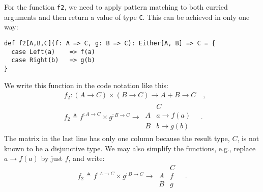 For the function \lstinline!f2!, we need to apply pattern matching
to both curried arguments and then return a value of type \lstinline!C!.
This can be achieved in only one way:
\begin{lstlisting}
def f2[A,B,C](f: A => C, g: B => C): Either[A, B] => C = {
  case Left(a)    => f(a)
  case Right(b)   => g(b)
}
\end{lstlisting}
We write this function in the code notation like this:
\begin{align*}
 & f_{2}:\left(A\rightarrow C\right)\times\left(B\rightarrow C\right)\rightarrow A+B\rightarrow C\quad,\\
 & f_{2}\triangleq f^{:A\rightarrow C}\times g^{:B\rightarrow C}\rightarrow\,\begin{array}{|c||c|}
 & C\\
\hline A & a\rightarrow f(a)\\
B & b\rightarrow g(b)
\end{array}\quad.
\end{align*}
The matrix in the last line has only one column because the result
type, $C$, is not known to be a disjunctive type. We may also simplify
the functions, e.g., replace $a\rightarrow f(a)$ by just $f$, and
write:
\[
f_{2}\triangleq f^{:A\rightarrow C}\times g^{:B\rightarrow C}\rightarrow\,\begin{array}{|c||c|}
 & C\\
\hline A & f\\
B & g
\end{array}\quad.
\]

